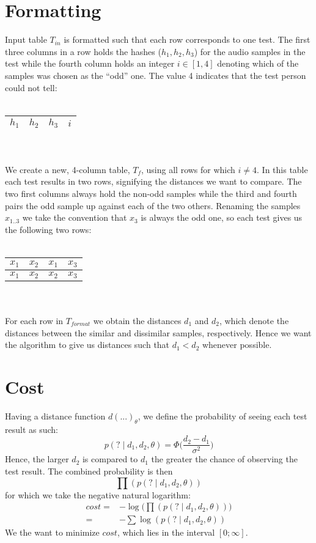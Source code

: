 \documentclass[12pt]{article}
\begin{document}
\section{Formatting}
Input table $T_{in}$ is formatted such that each row corresponds to one test. The first three columns in a row holds the hashes ($h_1, h_2, h_3$) for the audio samples in the test while the fourth column holds an integer $i \in [1,4]$ denoting which of the samples was chosen as the ``odd'' one. The value 4 indicates that the test person could not tell:\\\\
\begin{tabular}{| c | c | c | c |}
\hline$h_1$  & $h_2$ & $h_3$ & $i$ \\\hline
\end{tabular}\\\\
We create a new, 4-column table, $T_f$, using all rows for which $i \ne 4$. In this table each test results in two rows, signifying the distances we want to compare. The two first columns always hold the non-odd samples while the third and fourth pairs the odd sample up against each of the two others. Renaming the samples $x_{1..3}$ we take the convention that $x_3$ is always the odd one, so each test gives us the following two rows:\\\\
\begin{tabular}{| c | c | c | c |}
\hline
$x_1$  & $x_2$ & $x_1$ & $x_3$ \\\hline
$x_1$  & $x_2$ & $x_2$ & $x_3$ \\\hline
\end{tabular}\\\\
For each row in $T_{format}$ we obtain the distances $d_1$ and $d_2$, which denote the distances between the similar and dissimilar samples, respectively. Hence we want the algorithm to give us distances such that $d_1 < d_2$ whenever possible.
\section{Cost}
Having a distance function $d(...)_\theta$, we define the probability of seeing each test result as such:
$$
p(? \mid d_1, d_2, \theta) = \Phi\Big(\frac{d_2-d_1}{\sigma^2}\Big)
$$
Hence, the larger $d_2$ is compared to $d_1$ the greater the chance of observing the test result. The combined probability is then
$$
\prod (p(? \mid d_1, d_2, \theta))
$$
for which we take the negative natural logarithm:
\begin{align*}  
cost
=& -\log\big(\prod (p(? \mid d_1, d_2, \theta))\big)\\
=& -\sum\log(p(? \mid d_1, d_2, \theta))
\end{align*}
We the want to minimize $cost$, which lies in the interval $[0; \infty]$.
\end{document}

